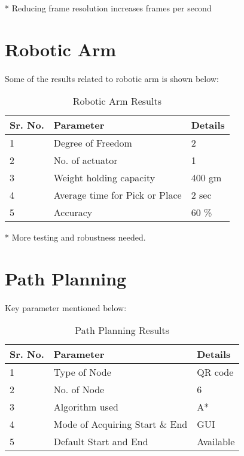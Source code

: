 * Reducing frame resolution increases frames per second 

\section{Robotic Arm}
\paragraph{} Some of the results related to robotic arm is shown below:

\begin{table}[htbp]
\caption{Robotic Arm Results}
\begin{center}
\begin{tabular}{|p{1.5cm}|p{6cm}|p{4cm}|}
\hline \textbf{Sr. No.} & \textbf{Parameter} & \textbf{Details}\\
\hline 1 & Degree of Freedom & 2 \\
\hline 2 & No. of actuator & 1\\
\hline 3 & Weight holding capacity & 400 gm\\
\hline 4 & Average time for Pick or Place &  2 sec\\
\hline 5 & Accuracy & 60 \%\\
\hline
\end{tabular}
\end{center}
\end{table}

* More testing and robustness needed.

\section{Path Planning}
\paragraph{} Key parameter mentioned below:

\begin{table}[htbp]
\caption{Path Planning Results}
\begin{center}
\begin{tabular}{|p{1.5cm}|p{6cm}|p{4cm}|}
\hline \textbf{Sr. No.} & \textbf{Parameter} & \textbf{Details}\\
\hline 1 & Type of Node & QR code \\
\hline 2 & No. of Node & 6 \\
\hline 3 & Algorithm used & A* \\
\hline 4 & Mode of Acquiring Start \& End & GUI\\
\hline 5 & Default Start and End & Available\\
\hline
\end{tabular}
\end{center}
\end{table}

